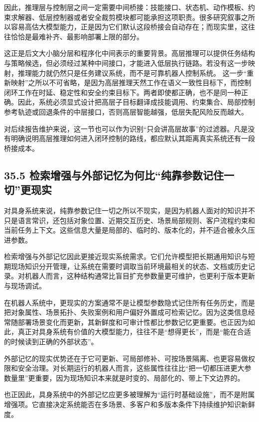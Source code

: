 因此，推理层与控制层之间一定需要中间桥接：技能接口、状态机、动作模板、约束求解器、低层控制器或者安全裁剪模块都可能承担这项职责。很多研究叙事之所以容易高估大模型能力，正是因为它们默认这段桥接会自动存在；而现实里，这往往恰恰是最难补齐、最影响部署上限的部分。

这正是后文大小脑分层和程序化中间表示的重要背景。高层推理可以提供任务结构与策略候选，但必须经过某种中间接口，才能进入低层执行链路。若没有这一步映射，推理能力就仍然只是任务建议系统，而不是可靠机器人控制系统。 这一步“重新映射”之所以不可省略，是因为高层推理天然工作在语义一致性目标下，而控制闭环工作在时延、稳定性和安全约束目标下。两者即使都正确，也不是同一种正确。因此，系统必须显式设计把高层子目标翻译成技能调用、约束集合、局部控制参考轨迹或回退条件的中层接口，否则高层智能越强，低层失配风险反而越大。

对后续报告维护来说，这一节也可以作为识别“只会讲高层故事”的过滤器。凡是没有明确说明高层推理如何进入闭环控制的路线，都应默认其距离真实系统还有一段桥接成本。

\subsection*{35.5 检索增强与外部记忆为何比“纯靠参数记住一切”更现实}


对具身系统来说，纯靠参数记住一切之所以不现实，是因为机器人面对的知识并不只是语言常识，还包括对象位置、近期交互历史、场景局部规则、客户流程约束和当前任务上下文。这些信息大量是局部的、临时的、版本化的，并不适合被永久压进参数。

检索增强与外部记忆因此更接近现实系统需求。它们允许模型把长期通用知识与短期现场知识分开管理，让系统在需要时调取当前环境最相关的状态、文档或历史记录。对机器人而言，这种结构通常比盲目扩充参数量更可维护，也更利于版本更新与现场调试。

在机器人系统中，更现实的方案通常不是让模型参数隐式记住所有任务历史，而是把对象属性、场景拓扑、失败案例和用户偏好外置成可检索记忆。因为这类信息经常随部署场景变化而更新，其新鲜度和可审计性都比参数记忆更重要。也正因为如此，真正对具身系统有价值的大模型能力，往往不是“想得更长”，而是“能在合适的时候读到正确的外部状态”。

外部记忆的现实优势还在于它可更新、可局部修补、可按场景隔离、也更容易做权限和安全治理。对长期运行的机器人而言，这些属性往往比“把一切都压进更大参数量里”更重要，因为现场知识本来就是时变的、局部化的、带上下文边界的。

也正因此，具身系统中的外部记忆应更多被理解为“运行时基础设施”，而不是附属增强项。它直接决定系统能否在多场景、多客户和多版本条件下持续维护知识新鲜度。

